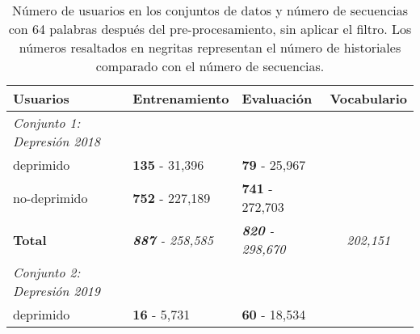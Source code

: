 \begin{table}[!hbt]
\caption{Número de usuarios en los conjuntos de datos y número de secuencias con 64 palabras después del pre-procesamiento, sin aplicar el filtro. Los números resaltados en negritas representan el número de historiales comparado con el número de secuencias.} \label{table:original_users}

\begin{center}

\begin{tabular}{llll}
\hline
\rowcolor[HTML]{FFFFFF} 
\textbf{Usuarios}                                           & \textbf{Entrenamiento}                       & \textbf{Evaluación}                          & \textbf{Vocabulario}                                         \\ \hline
\rowcolor[HTML]{EFEFEF} 
\textit{Conjunto 1: Depresión 2018}                         & \multicolumn{1}{c}{\cellcolor[HTML]{EFEFEF}} & \multicolumn{1}{c}{\cellcolor[HTML]{EFEFEF}} &                                                              \\ \hline
\rowcolor[HTML]{FFFFFF} 
deprimido                                                   & \textbf{135} - 31,396                                 & \textbf{79} - 25,967                                  &                                                              \\ \hline
\rowcolor[HTML]{FFFFFF} 
no-deprimido                                                & \textbf{752} - 227,189                                & \textbf{741} - 272,703                                &                                                              \\ \hline
\rowcolor[HTML]{FFFFFF} 
\textbf{Total}                                              & \textit{\textbf{887} - 258,585}                       & \textit{\textbf{820} - 298,670}                       & \multicolumn{1}{c}{\cellcolor[HTML]{FFFFFF}\textit{202,151}} \\ \hline
\rowcolor[HTML]{EFEFEF} 
\cellcolor[HTML]{EFEFEF}\textit{Conjunto 2: Depresión 2019} &                                              &                                              &                                                              \\ \hline
\rowcolor[HTML]{FFFFFF} 
deprimido                                                   & \textbf{16} - 5,731                                   & \textbf{60} - 18,534                                  &                                                              \\ \hline

\end{tabular}
\end{center}
\end{table}
